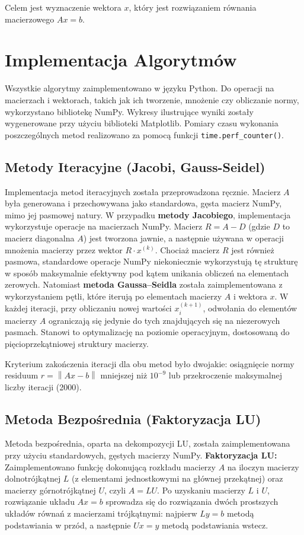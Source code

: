 \documentclass[a4paper, 11pt]{article}
\newcommand{\norm}[1]{\left\lVert#1\right\rVert}
\begin{document}
Celem jest wyznaczenie wektora $x$, który jest rozwiązaniem równania macierzowego $Ax = b$.


\section{Implementacja Algorytmów}
Wszystkie algorytmy zaimplementowano w języku Python. Do operacji na macierzach i wektorach, takich jak ich tworzenie, mnożenie czy obliczanie normy, wykorzystano bibliotekę NumPy. Wykresy ilustrujące wyniki zostały wygenerowane przy użyciu biblioteki Matplotlib. Pomiary czasu wykonania poszczególnych metod realizowano za pomocą funkcji \texttt{time.perf\_counter()}.

\subsection{Metody Iteracyjne (Jacobi, Gauss-Seidel)}
Implementacja metod iteracyjnych została przeprowadzona ręcznie. Macierz $A$ była generowana i przechowywana jako standardowa, gęsta macierz NumPy, mimo jej pasmowej natury.
W przypadku \textbf{metody Jacobiego}, implementacja wykorzystuje operacje na macierzach NumPy. Macierz $R = A - D$ (gdzie $D$ to macierz diagonalna $A$) jest tworzona jawnie, a następnie używana w operacji mnożenia macierzy przez wektor $R \cdot x^{(k)}$. Chociaż macierz $R$ jest również pasmowa, standardowe operacje NumPy niekoniecznie wykorzystują tę strukturę w sposób maksymalnie efektywny pod kątem unikania obliczeń na elementach zerowych.
Natomiast \textbf{metoda Gaussa–Seidla} została zaimplementowana z wykorzystaniem pętli, które iterują po elementach macierzy $A$ i wektora $x$. W każdej iteracji, przy obliczaniu nowej wartości $x_i^{(k+1)}$, odwołania do elementów macierzy $A$ ograniczają się jedynie do tych znajdujących się na niezerowych pasmach. Stanowi to optymalizację na poziomie operacyjnym, dostosowaną do pięcioprzekątniowej struktury macierzy.

Kryterium zakończenia iteracji dla obu metod było dwojakie: osiągnięcie normy residuum $r = \norm{Ax - b}$ mniejszej niż $10^{-9}$ lub przekroczenie maksymalnej liczby iteracji (2000).

\subsection{Metoda Bezpośrednia (Faktoryzacja LU)}
Metoda bezpośrednia, oparta na dekompozycji LU, została zaimplementowana przy użyciu standardowych, gęstych macierzy NumPy.
\textbf{Faktoryzacja LU:} Zaimplementowano funkcję dokonującą rozkładu macierzy $A$ na iloczyn macierzy dolnotrójkątnej $L$ (z elementami jednostkowymi na głównej przekątnej) oraz macierzy górnotrójkątnej $U$, czyli $A = LU$.
Po uzyskaniu macierzy $L$ i $U$, rozwiązanie układu $Ax=b$ sprowadza się do rozwiązania dwóch prostszych układów równań z macierzami trójkątnymi: najpierw $Ly=b$ metodą podstawiania w przód, a następnie $Ux=y$ metodą podstawiania wstecz.
\end{document}
